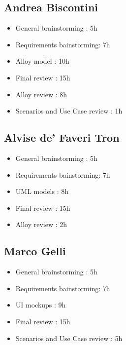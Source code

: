 \subsection{Andrea Biscontini}
\begin{itemize}
	\item General brainstorming : 5h
	\item Requirements bainstorming: 7h
	\item Alloy model : 10h
	\item Final review : 15h
	\item Alloy review : 8h
	\item Scenarios and Use Case review : 1h
\end{itemize}
\subsection{Alvise de' Faveri Tron}
\begin{itemize}
	\item General brainstorming : 5h
	\item Requirements bainstorming: 7h
	\item UML models : 8h
	\item Final review : 15h
	\item Alloy review : 2h
\end{itemize}
\subsection{Marco Gelli}
\begin{itemize}
	\item General brainstorming : 5h
	\item Requirements bainstorming: 7h
	\item UI mockups : 9h
	\item Final review : 15h
	\item Scenarios and Use Case review : 5h
\end{itemize}